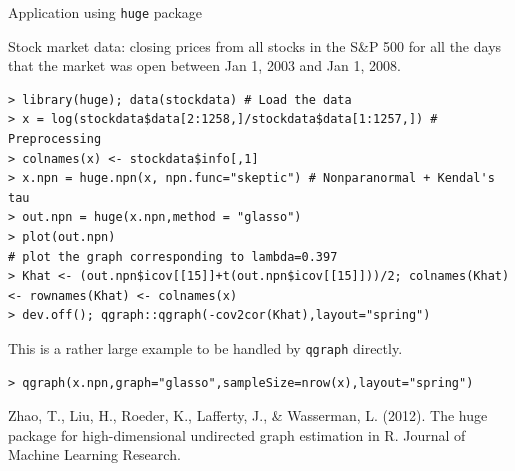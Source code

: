 \documentclass[11pt,handout,aspectratio=169,dvipsnames]{beamer}
\begin{document}
\begin{frame}[fragile]{Application using \texttt{huge} package}

{\small Stock market data: closing prices from all stocks in the S\&P 500 for all the days that the market was open between Jan 1, 2003 and Jan 1, 2008. }
	\begin{lstlisting}
> library(huge); data(stockdata) # Load the data 
> x = log(stockdata$data[2:1258,]/stockdata$data[1:1257,]) # Preprocessing 
> colnames(x) <- stockdata$info[,1]
> x.npn = huge.npn(x, npn.func="skeptic") # Nonparanormal + Kendal's tau
> out.npn = huge(x.npn,method = "glasso")
> plot(out.npn)
# plot the graph corresponding to lambda=0.397
> Khat <- (out.npn$icov[[15]]+t(out.npn$icov[[15]]))/2; colnames(Khat) <- rownames(Khat) <- colnames(x)
> dev.off(); qgraph::qgraph(-cov2cor(Khat),layout="spring")
\end{lstlisting}
	This is a rather large example to be handled by \texttt{qgraph} directly.
	\begin{lstlisting}
> qgraph(x.npn,graph="glasso",sampleSize=nrow(x),layout="spring")
\end{lstlisting}

	{\scriptsize Zhao, T., Liu, H., Roeder, K., Lafferty, J., \& Wasserman, L. (2012). The huge package for high-dimensional undirected graph estimation in R. Journal of Machine Learning Research.}
\end{frame}
\end{document}
